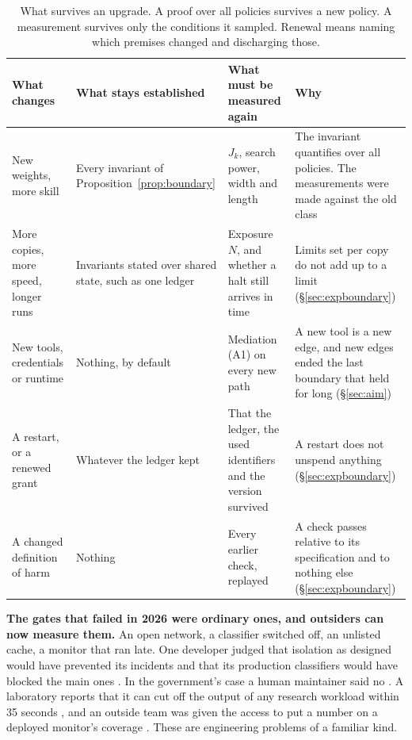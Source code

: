 \documentclass[10pt,twocolumn,letterpaper]{article}
\theoremstyle{definition}
\newcommand{\para}[1]{\smallskip\noindent\textbf{#1}\enspace}
\begin{document}
\begin{table}[t]
\centering
\footnotesize
\setlength{\tabcolsep}{5pt}
\renewcommand{\arraystretch}{1.16}
\begin{tabularx}{\textwidth}{@{}P{1.45in}P{1.75in}P{1.6in}L@{}}
\toprule
\textbf{What changes} & \textbf{What stays established} & \textbf{What must be measured again} & \textbf{Why}\\
\midrule
New weights, more skill & Every invariant of Proposition~\ref{prop:boundary} & $J_{k}$, search power, width and length & The invariant quantifies over all policies. The measurements were made against the old class\\
More copies, more speed, longer runs & Invariants stated over shared state, such as one ledger & Exposure $N$, and whether a halt still arrives in time & Limits set per copy do not add up to a limit (\S\ref{sec:expboundary})\\
New tools, credentials or runtime & Nothing, by default & Mediation (A1) on every new path & A new tool is a new edge, and new edges ended the last boundary that held for long (\S\ref{sec:aim})\\
A restart, or a renewed grant & Whatever the ledger kept & That the ledger, the used identifiers and the version survived & A restart does not unspend anything (\S\ref{sec:expboundary})\\
A changed definition of harm & Nothing & Every earlier check, replayed & A check passes relative to its specification and to nothing else (\S\ref{sec:expboundary})\\
\bottomrule
\end{tabularx}
\caption{What survives an upgrade. A proof over all policies survives a new policy. A measurement survives only the conditions it sampled. Renewal means naming which premises changed and discharging those.}
\label{tab:upgrade}
\end{table}

\para{The gates that failed in 2026 were ordinary ones, and outsiders can now measure them.} An open network, a classifier switched off, an unlisted cache, a monitor that ran late. One developer judged that isolation as designed would have prevented its incidents and that its production classifiers would have blocked the main ones \cite{anthropic-cyber}. In the government's case a human maintainer said no \cite{anthropic-aisi}. A laboratory reports that it can cut off the output of any research workload within 35 seconds \cite{controlroom}, and an outside team was given the access to put a number on a deployed monitor's coverage \cite{metraudit}. These are engineering problems of a familiar kind.
\end{document}
